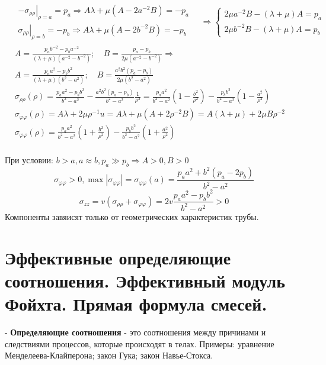 $\begin{aligned}
& \begin{array}{l}-\left.\sigma_{\rho \rho}\right|_{\rho=a}=p_a \Rightarrow A \lambda+\mu\left(A-2 a^{-2} B\right)=-p_a \\ \left.\sigma_{\rho \rho}\right|_{\rho=b}=-p_b \Rightarrow A \lambda+\mu\left(A-2 b^{-2} B\right)=-p_b\end{array} \quad \Rightarrow\left\{\begin{array}{l}2 \mu a^{-2} B-(\lambda+\mu) A=p_a \\ 2 \mu b^{-2} B-(\lambda+\mu) A=p_b\end{array}\right. \\ & A=\frac{p_a b^{-2}-p_b a^{-2}}{(\lambda+\mu)\left(a^{-2}-b^{-2}\right)} ; \quad B=\frac{p_a-p_b}{2 \mu\left(a^{-2}-b^{-2}\right)} \Rightarrow \\ & A=\frac{p_a a^2-p_b b^2}{(\lambda+\mu)\left(b^2-a^2\right)} ; \quad B=\frac{a^2 b^2\left(p_a-p_b\right)}{2 \mu\left(b^2-a^2\right)} \\ & \sigma_{\rho \rho} (\rho) =\frac{p_a a^2-p_b b^2}{b^2-a^2}-\frac{a^2 b^2\left(p_a-p_b\right)}{b^2-a^2} \frac{1}{\rho^2}=\frac{p_a a^2}{b^2-a^2}\left(1-\frac{b^2}{\rho^2}\right)-\frac{p_b b^2}{b^2-a^2}\left(1-\frac{a^2}{\rho^2}\right) \\ & \sigma_{\varphi\varphi}(\rho)=A \lambda+2 \mu \rho^{-1} u=A \lambda+\mu\left(A+2 \rho^{-2} B\right)=A(\lambda+\mu)+2 \mu B \rho^{-2}\
\\ &\sigma_{\varphi \varphi}(\rho)=\frac{p_a a^2}{b^2-a^2}\left(1+\frac{b^2}{\rho^2}\right)-\frac{p_b b^2}{b^2-a^2}\left(1+\frac{a^2}{\rho^2}\right)\ &
\\ & \end{aligned}$

При условии: $b>a, a \approx b, p_a \gg p_b \Rightarrow A>0, B>0$ 
$$
\sigma_{\varphi \varphi}>0, \max \left|\sigma_{\varphi \varphi}\right|=\sigma_{\varphi \varphi}(a)=\frac{p_a a^2+b^2\left(p_a-2 p_b\right)}{b^2-a^2}
$$
$$
\sigma_{z z}=v\left(\sigma_{\rho \rho}+\sigma_{\varphi \varphi}\right)=2 v \frac{p_a a^2-p_b b^2}{b^2-a^2}>0
$$
Компоненты завяисят только от геометрических характеристик трубы.

\section{Эффективные определяющие соотношения. Эффективный модуль Фойхта. Прямая формула смесей.}
- \textbf{Определяющие соотношения} - это соотношения между причинами и следствиями процессов, которые происходят в телах. Примеры: уравнение Менделеева-Клайперона; закон Гука; закон Навье-Стокса.

